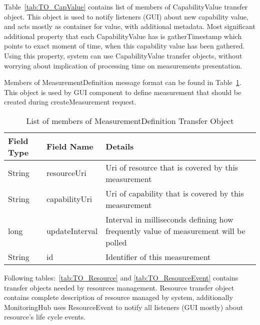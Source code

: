 Table~\ref{tab:TO_CapValue} contains list of members of CapabilityValue transfer object. This
object is used to notify listeners (GUI) about new capability value, and acts mostly as container for value, with
additional metadata. Most significant additional property that each CapabilityValue has is gatherTimestamp which points
to exact moment of time, when this capability value has been gathered. Using this property, system can use
CapabilityValue transfer objects, without worrying about implication of processing time on measurements presentation.

Members of MeasurementDefinition message format can be found in Table~\ref{tab:TO_MeasurementDef}. This object is used
by GUI component to define measurement that should be created during createMeasurement request.



\begin{table}[ht] %
\begin{tabular}{| m{} | m{} | m{} |}
   \hline 
   \cellcolor[gray]{0.9} Field Type & \cellcolor[gray]{0.9} Field Name & \cellcolor[gray]{0.9} Details \\
   \hline 
   String  & resourceUri &  Uri of resource that is covered by this measurement \\
   String & capabilityUri & Uri of capability that is covered by this measurement \\
   long & updateInterval & Interval in milliseconds defining how frequently value of measurement will be polled \\
   String & id & Identifier of this measurement \\ 
   \hline 
\end{tabular}
 \caption{List of members of MeasurementDefinition Transfer Object}
 \label{tab:TO_MeasurementDef}
\end{table} %

Following tables:~\ref{tab:TO_Resource} and \ref{tab:TO_ResourceEvent} contains transfer objects needed by resources
management. Resource transfer object contains complete description of resource managed by system, additionally
MonitoringHub uses ResourceEvent to notify all listeners (GUI mostly) about resource's life cycle events.  

